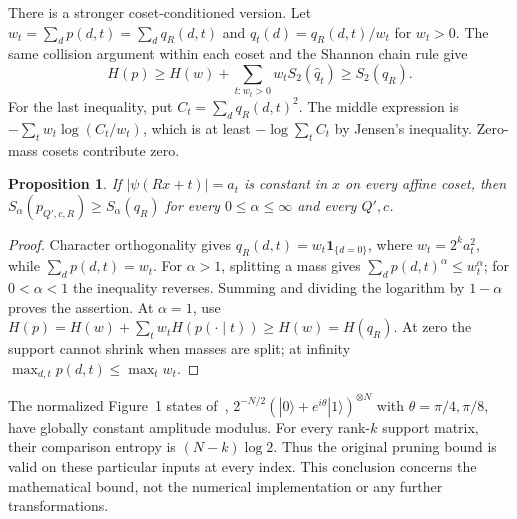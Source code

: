 \documentclass[11pt]{article}
\newtheorem{proposition}[theorem]{Proposition}
\newcommand{\HH}{H}
\begin{document}
There is a stronger coset-conditioned version. Let
$w_t=\sum_d p(d,t)=\sum_d q_R(d,t)$ and
$\widehat q_t(d)=q_R(d,t)/w_t$ for $w_t>0$.
The same collision argument within each coset and the Shannon chain rule give
\begin{equation}\label{eq:conditioned}
 \HH(p)\ge \HH(w)+\sum_{t:w_t>0}w_tS_2(\widehat q_t)
 \ge S_2(q_R).
\end{equation}
For the last inequality, put $C_t=\sum_dq_R(d,t)^2$.
The middle expression is $-\sum_tw_t\log(C_t/w_t)$, which is at least
$-\log\sum_tC_t$ by Jensen's inequality. Zero-mass cosets contribute zero.

\begin{proposition}\label{prop:flat}
If $|\psi(Rx+t)|=a_t$ is constant in $x$ on every affine coset, then
$S_\alpha(p_{Q',c,R})\ge S_\alpha(q_R)$ for every
$0\le\alpha\le\infty$ and every $Q',c$.
\end{proposition}
\begin{proof}
Character orthogonality gives $q_R(d,t)=w_t\mathbf1_{\{d=0\}}$,
where $w_t=2^ka_t^2$, while $\sum_dp(d,t)=w_t$.
For $\alpha>1$, splitting a mass gives
$\sum_dp(d,t)^\alpha\le w_t^\alpha$; for $0<\alpha<1$ the
inequality reverses. Summing and dividing the logarithm by $1-\alpha$
proves the assertion. At $\alpha=1$, use
$\HH(p)=\HH(w)+\sum_tw_t\HH(p(\cdot\mid t))\ge\HH(w)=\HH(q_R)$.
At zero the support cannot shrink when masses are split; at infinity
$\max_{d,t}p(d,t)\le\max_tw_t$.
\end{proof}
The normalized Figure~1 states of~\cite{posing},
$2^{-N/2}(|0\rangle+e^{i\theta}|1\rangle)^{\otimes N}$ with
$\theta=\pi/4,\pi/8$, have globally constant amplitude modulus.
For every rank-$k$ support matrix, their comparison entropy is
$(N-k)\log2$. Thus the original pruning bound is valid on these
particular inputs at every index. This conclusion concerns the mathematical
bound, not the numerical implementation or any further transformations.
\end{document}
